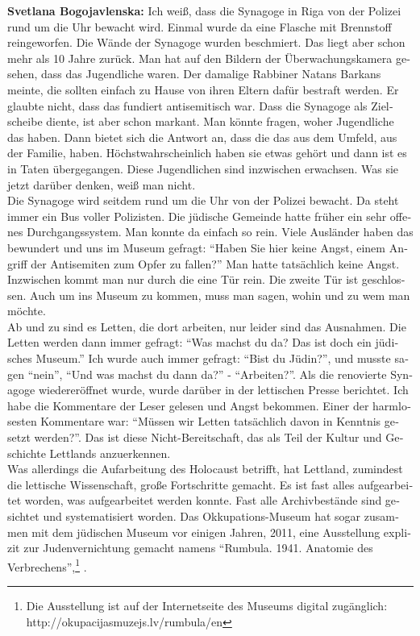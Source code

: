 \begin{otherlanguage}{ngerman}
\textbf{Svetlana Bogojavlenska:} Ich weiß, dass die Synagoge in Riga von der Polizei rund um die Uhr bewacht wird. Einmal wurde da eine Flasche mit Brennstoff reingeworfen. Die Wände der Synagoge wurden beschmiert. Das liegt aber schon mehr als 10 Jahre zurück. Man hat auf den Bildern der Überwachungskamera gesehen, dass das Jugendliche waren. Der damalige Rabbiner Natans Barkans meinte, die sollten einfach zu Hause von ihren Eltern dafür bestraft werden. Er glaubte nicht, dass das fundiert antisemitisch war. Dass die Synagoge als Zielscheibe diente, ist aber schon markant. Man könnte fragen, woher Jugendliche das haben. Dann bietet sich die Antwort an, dass die das aus dem Umfeld, aus der Familie, haben. Höchstwahrscheinlich haben sie etwas gehört und dann ist es in Taten übergegangen. Diese Jugendlichen sind inzwischen erwachsen. Was sie jetzt darüber denken, weiß man nicht.\\ 
Die Synagoge wird seitdem rund um die Uhr von der Polizei bewacht. Da steht immer ein Bus voller Polizisten. Die jüdische Gemeinde hatte früher ein sehr offenes Durchgangssystem. Man konnte da einfach so rein. Viele Ausländer haben das bewundert und uns im Museum gefragt: "`Haben Sie hier keine Angst, einem Angriff der Antisemiten zum Opfer zu fallen?"' Man hatte tatsächlich keine Angst. Inzwischen kommt man nur durch die eine Tür rein. Die zweite Tür ist geschlossen. Auch um ins Museum zu kommen, muss man sagen, wohin und zu wem man möchte.\\
Ab und zu sind es Letten, die dort arbeiten, nur leider sind das Ausnahmen. Die Letten werden dann immer gefragt: "`Was machst du da? Das ist doch ein jüdisches Museum."' Ich wurde auch immer gefragt: "`Bist du Jüdin?"', und musste sagen "`nein"', "`Und was machst du dann da?"' - "`Arbeiten?"'. Als die renovierte Synagoge wiedereröffnet wurde, wurde darüber in der lettischen Presse berichtet. Ich habe die Kommentare der Leser gelesen und Angst bekommen. Einer der harmlosesten Kommentare war: "`Müssen wir Letten tatsächlich davon in Kenntnis gesetzt werden?"'. Das ist diese Nicht-Bereitschaft, das als Teil der Kultur und Geschichte Lettlands anzuerkennen.\\
Was allerdings die Aufarbeitung des Holocaust betrifft, hat Lettland, zumindest die lettische Wissenschaft, große Fortschritte gemacht. Es ist fast alles aufgearbeitet worden, was aufgearbeitet werden konnte. Fast alle Archivbestände sind gesichtet und systematisiert worden. Das Okkupations-Museum hat sogar zusammen mit dem jüdischen Museum vor einigen Jahren, 2011, eine Ausstellung explizit zur Judenvernichtung gemacht namens "`Rumbula. 1941. Anatomie des Verbrechens"',\footnote{Die Ausstellung ist auf der Internetseite des Museums digital zugänglich: http://okupacijasmuzejs.lv/rumbula/en} .


\end{otherlanguage}
